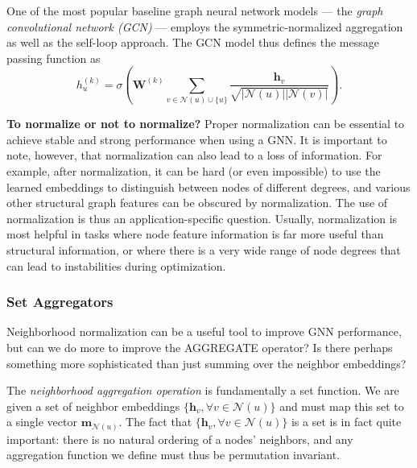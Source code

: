 \documentclass[10pt]{book}
\let\defaultmarginpar\marginpar
\renewcommand\marginpar[2][]{\defaultmarginpar{\itshape\color{gray}#2}}
\begin{document}
One of the most popular baseline graph neural network models --- the \emph{graph convolutional network (GCN)}\marginpar{graph convolutional network (GCN)} --- employs the symmetric-normalized aggregation as well as the self-loop approach. The GCN model thus defines the  message passing function as
\begin{equation}
    h^{(k)}_u = \sigma \left( \mathbf W^{(k)} \sum_{v \in \mathcal N(u) \cup \{u\}} \frac{\mathbf h_v}{\sqrt{|\mathcal N(u)| |\mathcal N(v)|}} \right).
\end{equation}

\textbf{To normalize or not to normalize?} Proper normalization can be essential to achieve stable and strong performance when using a GNN. It is important to note, however, that normalization can also lead to a loss of information. For example, after normalization, it can be hard (or even impossible) to use the learned embeddings to distinguish between nodes of different degrees, and various other structural graph features can be obscured by normalization. The use of normalization is thus an application-specific question. Usually, normalization is most helpful in tasks where node feature information is far more useful than structural information, or where there is a very wide range of node degrees that can lead to instabilities during optimization.

\subsubsection{Set Aggregators}

Neighborhood normalization can be a useful tool to improve GNN performance, but can we do more to improve the AGGREGATE operator? Is there perhaps something more sophisticated than just summing over the neighbor embeddings?

The \emph{neighborhood aggregation operation} is fundamentally a set function. We are given a set of neighbor embeddings $\{\mathbf h_v, \forall v \in \mathcal N(u)\}$ and must map this set to a single vector $\mathbf m_{\mathcal N(u)}$. The fact that $\{\mathbf h_v, \forall v \in \mathcal N(u)\}$ is a set is in fact quite important: there is no natural ordering of a nodes’ neighbors, and any aggregation function we define must thus be permutation invariant.
\end{document}
